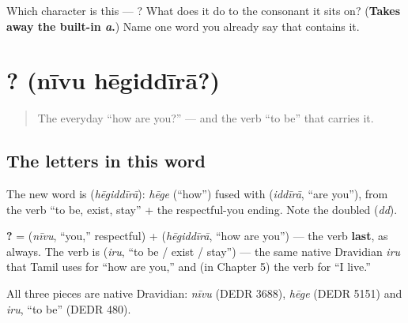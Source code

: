 \begin{tcolorbox}[breakable,colback=teal!4,colframe=teal!35!black,title={Before you move on}]
Which character is this — ? What does it do to the consonant it sits on? (\textbf{Takes away the built-in \emph{a}.}) Name one word you already say that contains it.
\end{tcolorbox}
\section[\texorpdfstring{\kn{ನೀವು} \kn{ಹೇಗಿದ್ದೀರಾ}? (nīvu hēgiddīrā)}{ನೀವು ಹೇಗಿದ್ದೀರಾ? (nīvu hēgiddīrā)}]{ ? (nīvu hēgiddīrā?)}

\label{lesson:KA-C03-niivu-hegiddiira}



\begin{quote}
The everyday \textquotedblleft{}how are you?\textquotedblright{} — and the verb \textquotedblleft{}to be\textquotedblright{} that carries it.
\end{quote}

\subsection*{The letters in this word}
The new word is \textbf{} (\emph{hēgiddīrā}): \emph{hēge} (\textquotedblleft{}how\textquotedblright{}) fused with \textbf{} (\emph{iddīrā}, \textquotedblleft{}are you\textquotedblright{}), from the verb \textquotedblleft{}to be, exist, stay\textquotedblright{} + the respectful-you ending. Note the doubled \textbf{} (\emph{dd}).

\begin{cousinweb}
\textbf{ ?} = \textbf{} (\emph{nīvu}, \textquotedblleft{}you,\textquotedblright{} respectful) + \textbf{} (\emph{hēgiddīrā}, \textquotedblleft{}how are you\textquotedblright{}) — the verb \textbf{last}, as always. The verb is \textbf{} (\emph{iru}, \textquotedblleft{}to be / exist / stay\textquotedblright{}) — the same native Dravidian \emph{iru} that Tamil uses for \textquotedblleft{}how are you,\textquotedblright{} and (in Chapter 5) the verb for \textquotedblleft{}I live.\textquotedblright{}

All three pieces are native Dravidian: \emph{nīvu} (DEDR 3688), \emph{hēge} (DEDR 5151) and \emph{iru}, \textquotedblleft{}to be\textquotedblright{} (DEDR 480).
\end{cousinweb}


